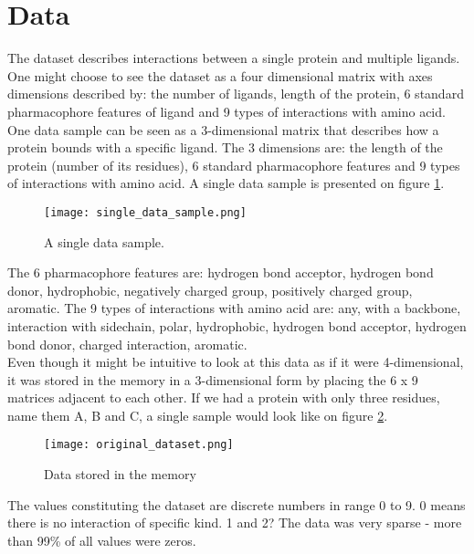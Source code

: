 \documentclass[a4paper,10pt]{report}
\begin{document}
	 
      
      \section{Data}
	The dataset describes interactions between a single protein and multiple ligands. One might choose to see the dataset as a four dimensional matrix with axes dimensions described by: the number of ligands, length of the protein, 6 standard pharmacophore features of ligand and 9 types of interactions with amino acid\cite{2DSIFT}. One data sample can be seen as a 3-dimensional matrix that describes how a protein bounds with a specific ligand. The 3 dimensions are: the length of the protein (number of its residues), 6 standard pharmacophore features and 9 types of interactions with amino acid. A single data sample is presented on figure \ref{fig:single_data_sample2}.\\
	
	\begin{figure}[h!]
	  \centering
	  \texttt{[image: single\_data\_sample.png]}
	  \caption{A single data sample.}
	  \label{fig:single_data_sample2}
	\end{figure} 
	
	The 6 pharmacophore features are: hydrogen bond acceptor, hydrogen bond donor, hydrophobic, negatively charged group, positively charged group, aromatic. The 9 types of interactions with amino acid are: any, with a backbone, interaction with sidechain, polar, hydrophobic, hydrogen bond acceptor, hydrogen bond donor, charged interaction, aromatic.\\
	
	Even though it might be intuitive to look at this data as if it were 4-dimensional, it was stored in the memory in a 3-dimensional form by placing the 6 x 9 matrices adjacent to each other. If we had a protein with only three residues, name them A, B and C, a single sample would look like on figure \ref{fig:data_original}.\\
	
	\begin{figure}[h!]
	  \centering
	  \texttt{[image: original\_dataset.png]}
	  \caption{Data stored in the memory}
	  \label{fig:data_original}
	\end{figure} 
	
	The values constituting the dataset are discrete numbers in range 0 to 9. 0 means there is no interaction of specific kind. 1 and 2? The data was very sparse - more than 99\% of all values were zeros.\\
	
\end{document}
